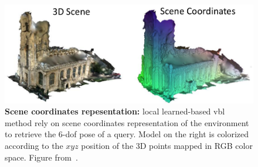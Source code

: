 \begin{figure}
	\begin{minipage}{0.58\linewidth}
		\includegraphics[width=\linewidth]{methods/scene_coordinates}
	\end{minipage}
	\begin{minipage}{0.4\linewidth}
		\caption[Scene coordinates repesentation]{\label{fig:scene_coordinates}\textbf{Scene coordinates repesentation:} local learned-based \acs{vbl} method rely on scene coordinates representation of the environment to retrieve the 6-\acs{dof} pose of a query. Model on the right is colorized according to the $xyz$ position of the 3D points mapped in RGB color space. Figure from~\citep{Brachmann2017b}.}
	\end{minipage}
\end{figure}
